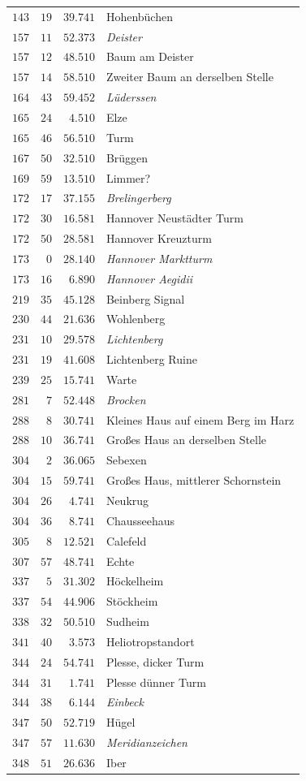 \begin{longtable}{@{}rrrp{.61\linewidth}@{}}
\(143\)&\(19\)&\(39.741\)&\raggedright Hohenbüchen\tabularnewline
\(157\)&\(11\)&\(52.373\)&\raggedright \textit{Deister}\tabularnewline
\(157\)&\(12\)&\(48.510\)&\raggedright Baum am Deister\tabularnewline
\(157\)&\(14\)&\(58.510\)&\raggedright Zweiter Baum an derselben Stelle\tabularnewline
\(164\)&\(43\)&\(59.452\)&\raggedright \textit{Lüderssen}\tabularnewline
\(165\)&\(24\)&\(4.510\)&\raggedright Elze\tabularnewline
\(165\)&\(46\)&\(56.510\)&\raggedright Turm\tabularnewline
\(167\)&\(50\)&\(32.510\)&\raggedright Brüggen\tabularnewline
\(169\)&\(59\)&\(13.510\)&\raggedright Limmer?\tabularnewline
\(172\)&\(17\)&\(37.155\)&\raggedright \textit{Brelingerberg}\tabularnewline
\(172\)&\(30\)&\(16.581\)&\raggedright Hannover Neustädter Turm\tabularnewline
\(172\)&\(50\)&\(28.581\)&\raggedright Hannover Kreuzturm\tabularnewline
\(173\)&\(0\)&\(28.140\)&\raggedright \textit{Hannover Marktturm}\tabularnewline
\(173\)&\(16\)&\(6.890\)&\raggedright \textit{Hannover Aegidii}\tabularnewline
\(219\)&\(35\)&\(45.128\)&\raggedright Beinberg Signal\tabularnewline
\(230\)&\(44\)&\(21.636\)&\raggedright Wohlenberg\tabularnewline
\(231\)&\(10\)&\(29.578\)&\raggedright \textit{Lichtenberg}\tabularnewline
\(231\)&\(19\)&\(41.608\)&\raggedright Lichtenberg Ruine\tabularnewline
\(239\)&\(25\)&\(15.741\)&\raggedright Warte\tabularnewline
\(281\)&\(7\)&\(52.448\)&\raggedright \textit{Brocken}\tabularnewline
\(288\)&\(8\)&\(30.741\)&\raggedright Kleines Haus auf einem Berg im Harz\tabularnewline
\(288\)&\(10\)&\(36.741\)&\raggedright Großes Haus an derselben Stelle\tabularnewline
\(304\)&\(2\)&\(36.065\)&\raggedright Sebexen\tabularnewline
\(304\)&\(15\)&\(59.741\)&\raggedright Großes Haus, mittlerer Schornstein\tabularnewline
\(304\)&\(26\)&\(4.741\)&\raggedright Neukrug\tabularnewline
\(304\)&\(36\)&\(8.741\)&\raggedright Chausseehaus\tabularnewline
\(305\)&\(8\)&\(12.521\)&\raggedright Calefeld\tabularnewline
\(307\)&\(57\)&\(48.741\)&\raggedright Echte\tabularnewline
\(337\)&\(5\)&\(31.302\)&\raggedright Höckelheim\tabularnewline
\(337\)&\(54\)&\(44.906\)&\raggedright Stöckheim\tabularnewline
\(338\)&\(32\)&\(50.510\)&\raggedright Sudheim\tabularnewline
\(341\)&\(40\)&\(3.573\)&\raggedright Heliotropstandort\tabularnewline
\(344\)&\(24\)&\(54.741\)&\raggedright Plesse, dicker Turm\tabularnewline
\(344\)&\(31\)&\(1.741\)&\raggedright Plesse dünner Turm\tabularnewline
\(344\)&\(38\)&\(6.144\)&\raggedright \textit{Einbeck}\tabularnewline
\(347\)&\(50\)&\(52.719\)&\raggedright Hügel\tabularnewline
\(347\)&\(57\)&\(11.630\)&\raggedright \textit{Meridianzeichen}\tabularnewline
\(348\)&\(51\)&\(26.636\)&\raggedright Iber\tabularnewline

\end{longtable}

